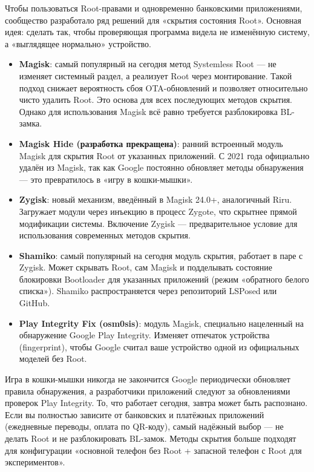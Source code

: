 Чтобы пользоваться Root-правами и одновременно банковскими приложениями, сообщество разработало ряд решений для «скрытия состояния Root». Основная идея: сделать так, чтобы проверяющая программа видела не изменённую систему, а «выглядящее нормально» устройство.

\begin{itemize}
  \item \textbf{Magisk}: самый популярный на сегодня метод Systemless Root — не изменяет системный раздел, а реализует Root через монтирование. Такой подход снижает вероятность сбоя OTA-обновлений и позволяет относительно чисто удалить Root. Это основа для всех последующих методов скрытия. Однако для использования Magisk всё равно требуется разблокировка BL-замка.
  \item \textbf{Magisk Hide (разработка прекращена)}: ранний встроенный модуль Magisk для скрытия Root от указанных приложений. С 2021 года официально удалён из Magisk, так как Google постоянно обновляет методы обнаружения — это превратилось в «игру в кошки-мышки».
  \item \textbf{Zygisk}: новый механизм, введённый в Magisk 24.0+, аналогичный Riru. Загружает модули через инъекцию в процесс Zygote, что скрытнее прямой модификации системы. Включение Zygisk — предварительное условие для использования современных методов скрытия.
  \item \textbf{Shamiko}: самый популярный на сегодня модуль скрытия, работает в паре с Zygisk. Может скрывать Root, сам Magisk и подделывать состояние блокировки Bootloader для указанных приложений (режим «обратного белого списка»). Shamiko распространяется через репозиторий LSPosed или GitHub.
  \item \textbf{Play Integrity Fix (osm0sis)}: модуль Magisk, специально нацеленный на обнаружение Google Play Integrity. Изменяет отпечаток устройства (fingerprint), чтобы Google считал ваше устройство одной из официальных моделей без Root.
\end{itemize}

\begin{tcbwarn}{Игра в кошки-мышки никогда не закончится}
Google периодически обновляет правила обнаружения, а разработчики приложений следуют за обновлениями проверок Play Integrity. То, что работает сегодня, завтра может быть распознано. Если вы полностью зависите от банковских и платёжных приложений (ежедневные переводы, оплата по QR-коду), самый надёжный выбор — не делать Root и не разблокировать BL-замок. Методы скрытия больше подходят для конфигурации «основной телефон без Root + запасной телефон с Root для экспериментов».

\end{tcbwarn}

